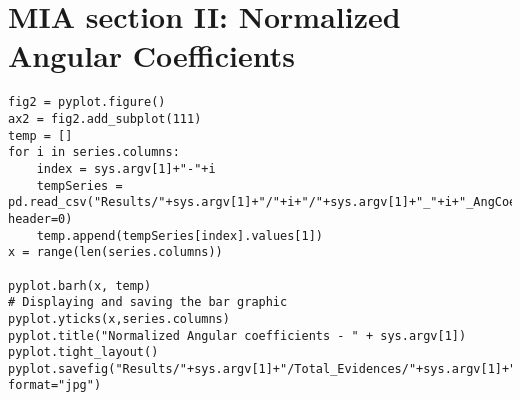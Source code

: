 \section{MIA section II: Normalized Angular Coefficients}
\label{MIA_section_II}

\begin{lstlisting}
fig2 = pyplot.figure()
ax2 = fig2.add_subplot(111)
temp = [] 
for i in series.columns:
	index = sys.argv[1]+"-"+i
	tempSeries = pd.read_csv("Results/"+sys.argv[1]+"/"+i+"/"+sys.argv[1]+"_"+i+"_AngCoeff.csv", header=0)
	temp.append(tempSeries[index].values[1])
x = range(len(series.columns))

pyplot.barh(x, temp)
# Displaying and saving the bar graphic  
pyplot.yticks(x,series.columns)
pyplot.title("Normalized Angular coefficients - " + sys.argv[1])
pyplot.tight_layout()
pyplot.savefig("Results/"+sys.argv[1]+"/Total_Evidences/"+sys.argv[1]+"_Norm_Ang_Coeffs.jpg", format="jpg")

\end{lstlisting}
